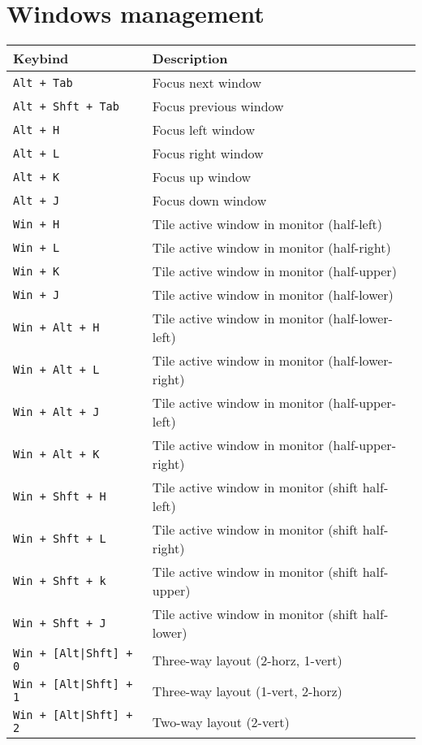 \documentclass[letterpaper,12pt]{article}
\begin{document}
\section*{Windows management}
\begin{table}[H]
  \begin{tabular}{|C{5cm}|L{10cm}|}
    \hline
    \textbf{Keybind} & \textbf{Description} \\
    \hline
    {\tt Alt + Tab} & Focus next window \\
    {\tt Alt + Shft + Tab} & Focus previous window \\
    {\tt Alt + H} & Focus left window \\
    {\tt Alt + L} & Focus right window \\
    {\tt Alt + K} & Focus up window \\
    {\tt Alt + J} & Focus down window \\
    \hline
    {\tt Win + H} & Tile active window in monitor (half-left) \\
    {\tt Win + L} & Tile active window in monitor (half-right) \\
    {\tt Win + K} & Tile active window in monitor (half-upper) \\
    {\tt Win + J} & Tile active window in monitor (half-lower) \\
    {\tt Win + Alt + H} & Tile active window in monitor (half-lower-left) \\
    {\tt Win + Alt + L} & Tile active window in monitor (half-lower-right) \\
    {\tt Win + Alt + J} & Tile active window in monitor (half-upper-left) \\
    {\tt Win + Alt + K} & Tile active window in monitor (half-upper-right) \\
    {\tt Win + Shft + H} & Tile active window in monitor (shift half-left) \\
    {\tt Win + Shft + L} & Tile active window in monitor (shift half-right) \\
    {\tt Win + Shft + k} & Tile active window in monitor (shift half-upper) \\
    {\tt Win + Shft + J} & Tile active window in monitor (shift half-lower) \\
    \hline
    {\tt Win + [Alt|Shft] + 0} & Three-way layout (2-horz, 1-vert) \\
    {\tt Win + [Alt|Shft] + 1} & Three-way layout (1-vert, 2-horz) \\
    {\tt Win + [Alt|Shft] + 2} & Two-way layout (2-vert) \\

\end{tabular}
\end{table}
\end{document}
